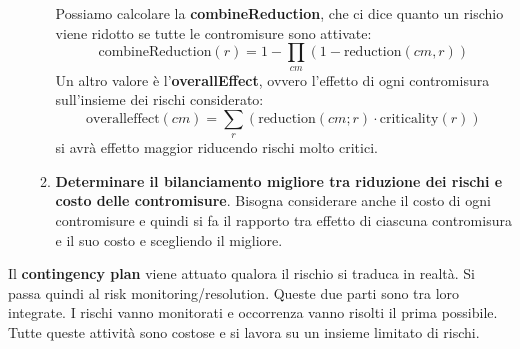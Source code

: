 \begin{enumerate}
\begin{enumerate}
        Possiamo calcolare la \textbf{combineReduction}, che ci dice quanto un rischio viene ridotto se tutte le contromisure sono attivate:
        \begin{equation}
            \text{combineReduction}(r) = 1 - \prod_{cm}(1 - \text{reduction}(cm, r))
        \end{equation}
        Un altro valore è l'\textbf{overallEffect}, ovvero l'effetto di ogni contromisura sull'insieme dei rischi considerato:
        \begin{equation}
            \text{overalleffect}(cm) = \sum_{r} (\text{reduction}(cm; r) \cdot \text{criticality}(r))
        \end{equation} si avrà effetto maggior riducendo rischi molto critici.
        \item \textbf{Determinare il bilanciamento migliore tra riduzione dei rischi e costo delle contromisure}. Bisogna considerare anche il costo di ogni contromisure e quindi si fa il rapporto tra effetto di ciascuna contromisura e il suo costo e scegliendo il migliore.
    \end{enumerate}
\end{enumerate}

Il \textbf{contingency plan} viene attuato qualora il rischio si traduca in realtà. Si passa quindi al risk monitoring/resolution. Queste due parti sono tra loro integrate. I rischi vanno monitorati e occorrenza vanno risolti il prima possibile. Tutte queste attività sono costose e si lavora su un insieme limitato di rischi.